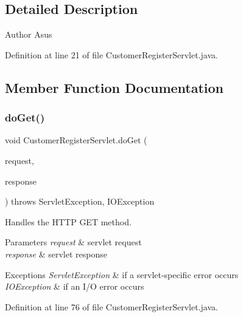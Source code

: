 \subsection{Detailed Description}
\begin{DoxyAuthor}{Author}
Asus 
\end{DoxyAuthor}


Definition at line 21 of file Customer\+Register\+Servlet.\+java.



\subsection{Member Function Documentation}
\mbox{\label{class_customer_register_servlet_a07b3e622f75a3b6e0138917342a965f6}} 
\subsubsection{\texorpdfstring{doGet()}{doGet()}}
{\footnotesize\ttfamily void Customer\+Register\+Servlet.\+do\+Get (\begin{DoxyParamCaption}\item[{Http\+Servlet\+Request}]{request,  }\item[{Http\+Servlet\+Response}]{response }\end{DoxyParamCaption}) throws Servlet\+Exception, I\+O\+Exception\hspace{0.3cm}{\ttfamily [protected]}}

Handles the H\+T\+TP {\ttfamily G\+ET} method.


\begin{DoxyParams}{Parameters}
{\em request} & servlet request \\
\hline
{\em response} & servlet response \\
\hline
\end{DoxyParams}

\begin{DoxyExceptions}{Exceptions}
{\em Servlet\+Exception} & if a servlet-\/specific error occurs \\
\hline
{\em I\+O\+Exception} & if an I/O error occurs \\
\hline
\end{DoxyExceptions}


Definition at line 76 of file Customer\+Register\+Servlet.\+java.

